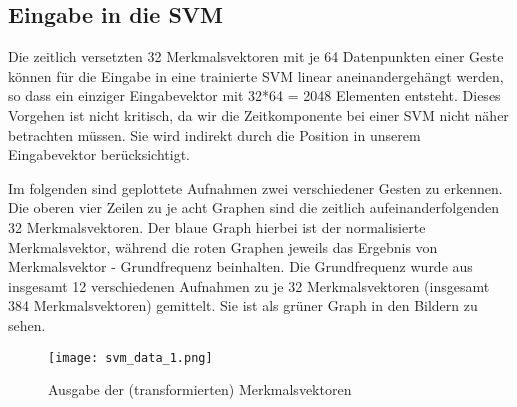 \subsection{Eingabe in die SVM}

Die zeitlich versetzten 32 Merkmalsvektoren mit je 64 Datenpunkten einer Geste können für die Eingabe in eine trainierte SVM linear aneinandergehängt werden, so dass ein einziger Eingabevektor mit 32*64 = 2048 Elementen entsteht. Dieses Vorgehen ist nicht kritisch, da wir die Zeitkomponente bei einer SVM nicht näher betrachten müssen. Sie wird indirekt durch die Position in unserem Eingabevektor berücksichtigt.

Im folgenden sind geplottete Aufnahmen zwei verschiedener Gesten zu erkennen. Die oberen vier Zeilen zu je acht Graphen sind die zeitlich aufeinanderfolgenden 32 Merkmalsvektoren. Der blaue Graph hierbei ist der normalisierte Merkmalsvektor, während die roten Graphen jeweils das Ergebnis von Merkmalsvektor - Grundfrequenz beinhalten. Die Grundfrequenz wurde aus insgesamt 12 verschiedenen Aufnahmen zu je 32 Merkmalsvektoren (insgesamt 384 Merkmalsvektoren) gemittelt. Sie ist als grüner Graph in den Bildern zu sehen.

\begin{figure}[h!]
  \centering
    \texttt{[image: svm\_data\_1.png]}
  \caption{Ausgabe der (transformierten) Merkmalsvektoren}
\end{figure}